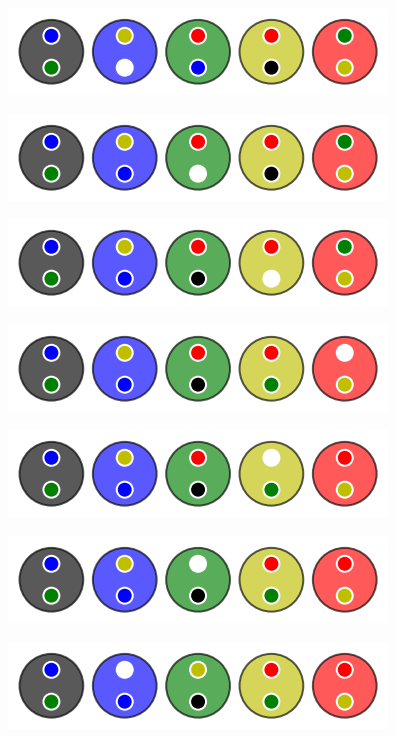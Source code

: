 \begin{multicols}{2}
	\begin{center}   %
		\includegraphics[scale= 0.45]{content/algo_bubble/example/000.png}

		\includegraphics[scale= 0.45]{content/algo_bubble/example/001.png}

		\includegraphics[scale= 0.45]{content/algo_bubble/example/002.png}

		\includegraphics[scale= 0.45]{content/algo_bubble/example/003.png}

		\includegraphics[scale= 0.45]{content/algo_bubble/example/004.png}

		\includegraphics[scale= 0.45]{content/algo_bubble/example/005.png}

		\includegraphics[scale= 0.45]{content/algo_bubble/example/006.png}


\end{center}
\end{multicols}
